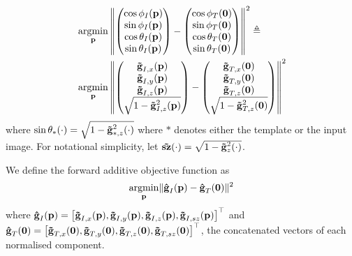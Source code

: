 \begin{equation}
    \begin{aligned}\label{eq:argmin_spherical}
        &\argmin_{\p} \left\lVert
            \begin{pmatrix}
                \cos{\phi_I}(\p) \\
                \sin{\phi_I}(\p) \\
                \cos{\theta_I}(\p) \\
                \sin{\theta_I}(\p)
            \end{pmatrix}
            -
            \begin{pmatrix}
                \cos{\phi_T}(\zero) \\
                \sin{\phi_T}(\zero) \\
                \cos{\theta_T}(\zero) \\
                \sin{\theta_T}(\zero)
            \end{pmatrix}
            \right\lVert^2 \triangleq \\
        &\argmin_{\p} \left\lVert
            \begin{pmatrix}
                \bb{\tilde{g}}_{I,x}(\p) \\ 
                \bb{\tilde{g}}_{I,y}(\p) \\ 
                \bb{\tilde{g}}_{I,z}(\p) \\ 
                \sqrt{1 - \bb{\tilde{g}}_{I,z}^2(\p)}
            \end{pmatrix}
            -
            \begin{pmatrix}
                \bb{\tilde{g}}_{T,x}(\zero) \\ 
                \bb{\tilde{g}}_{T,y}(\zero) \\ 
                \bb{\tilde{g}}_{T,z}(\zero) \\ 
                \sqrt{1 - \bb{\tilde{g}}_{T,z}^2(\zero)}
            \end{pmatrix}
            \right\lVert^2
    \end{aligned}
\end{equation}
where $\sin{\theta_{\ast}}(\cdot) = \sqrt{1 - {\boldsymbol{\mathbf{\tilde{g}}}_{\ast,z}^2}(\cdot)}$
where $\ast$ denotes either the template or the input image. For notational
simplicity, let $\boldsymbol{\mathbf{\tilde{sz}}}(\cdot) = \sqrt{1 - {\boldsymbol{\mathbf{\tilde{g}}}_{z}^2}(\cdot)}$.

We define the forward additive objective function as
\begin{equation}\label{eq:spher-ssd}
    \argmin_{\p} \norm{\bb{\hat{g}}_I(\p) - \bb{\hat{g}}_T(\zero)}^2
\end{equation}
where $\boldsymbol{\mathbf{\hat{g}}}_I(\boldsymbol{\mathbf{p}}) = {\left[  \boldsymbol{\mathbf{\tilde{g}}}_{I,x}(\boldsymbol{\mathbf{p}}),
\boldsymbol{\mathbf{\tilde{g}}}_{I,y}(\boldsymbol{\mathbf{p}}), \boldsymbol{\mathbf{\tilde{g}}}_{I,z}(\boldsymbol{\mathbf{p}}),
\boldsymbol{\mathbf{\tilde{g}}}_{I,sz}(\boldsymbol{\mathbf{p}}) \right]}^{\top}$ and $\boldsymbol{\mathbf{\hat{g}}}_T(\boldsymbol{\mathbf{0}}) =
{\left[ \boldsymbol{\mathbf{\tilde{g}}}_{T,x}(\boldsymbol{\mathbf{0}}), \boldsymbol{\mathbf{\tilde{g}}}_{T,y}(\boldsymbol{\mathbf{0}}),
\boldsymbol{\mathbf{\tilde{g}}}_{T,z}(\boldsymbol{\mathbf{0}}), \boldsymbol{\mathbf{\tilde{g}}}_{T,sz}(\boldsymbol{\mathbf{0}})
\right]}^{\top}$, the concatenated vectors of each normalised component.

